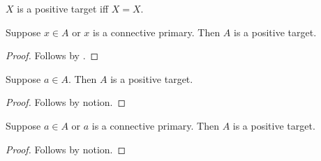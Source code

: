 

\begin{definition}\label{horn_positive_target}
    $X$ is a positive target iff $X=X$.
\end{definition}

\begin{classification}\label{horn_positive_disjunctive_parameter}
    Suppose $x\in A$ or $x$ is a connective primary.
    Then $A$ is a positive target.
\end{classification}
\begin{proof}
    Follows by .
\end{proof}

\begin{proposition}\label{horn_positive_parameter_consumer}
    Suppose $a\in A$.
    Then $A$ is a positive target.
\end{proposition}
\begin{proof}
    Follows by notion.
\end{proof}

\begin{proposition}\label{horn_positive_exact_alternative}
    Suppose $a\in A$ or $a$ is a connective primary.
    Then $A$ is a positive target.
\end{proposition}
\begin{proof}
    Follows by notion.
\end{proof}
